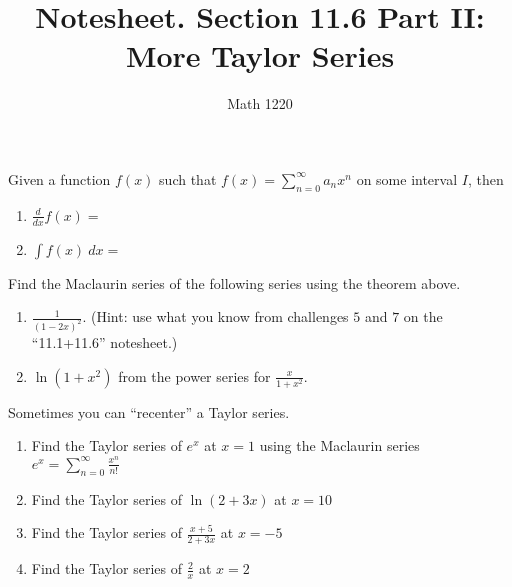 \documentclass[12pt, a4paper]{article}
\author{Math 1220}
\title{Notesheet. Section 11.6 Part II: More
  Taylor Series}
\date{}
\begin{document}
\maketitle
\nameline
\begin{thrm}
  Given a function \(f(x)\) such that \(f(x) = \sum_{n=0}^\infty a_n
  x^n\) on some interval \(I\), then
  \begin{enumerate}
  \item \(\frac{d}{dx} f(x) = \)
  \item \(\int f(x)\ dx = \)
  \end{enumerate}
\end{thrm}
\begin{ex}
  Find the Maclaurin series of the following series using the theorem above.   \begin{enumerate}
  \item \(\frac{1}{(1-2x)^2}\). (Hint: use what
  you know from challenges \(5\) and \(7\) on the ``11.1+11.6''
  notesheet.) \\
  \vspace{2in}
  \item \(\ln(1+x^2)\) from the power series for \(\frac{x}{1+x^2}\).
  \end{enumerate}
\end{ex}
\begin{ex}
  Sometimes you can ``recenter'' a Taylor series.
  \begin{enumerate}
  \item Find the Taylor series of \(e^x\) at \(x=1\) using the
    Maclaurin series \(e^x = \sum_{n=0}^\infty \frac{x^n}{n!}\)
    \vspace{2in}
  \item Find the Taylor series of \(\ln(2+3x)\) at \(x=10\)
    \vspace{2in}
  \item Find the Taylor series of \(\frac{x+5}{2+3x}\) at \(x=-5\)
    \vspace{2in}
  \item Find the Taylor series of \(\frac{2}{x}\) at \(x=2\)
  \end{enumerate}
\end{ex}
\end{document}
